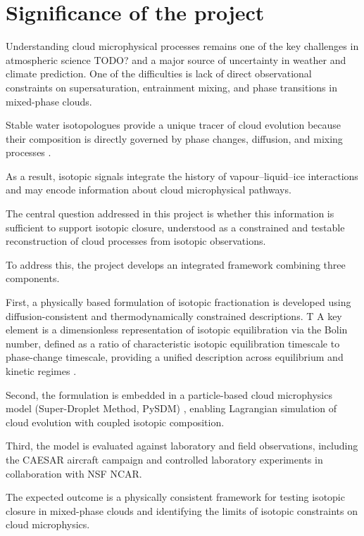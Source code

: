 \documentclass[12pt]{article}
\begin{document}
\section{Significance of the project}
Understanding cloud microphysical processes remains one of the key challenges in atmospheric science
TODO? and a major source of uncertainty in weather and climate prediction.
One of the difficulties is lack of direct observational constraints on supersaturation,
entrainment mixing, and phase transitions in mixed-phase clouds.

Stable water isotopologues provide a unique tracer of cloud evolution because their composition
is directly governed by phase changes, diffusion, and mixing processes
\cite{2008_Horita_EtAl,1975_Merlivat_Coantic,2003_Cappa_EtAl}.

As a result, isotopic signals integrate the history of vapour–liquid–ice interactions
and may encode information about cloud microphysical pathways.

The central question addressed in this project is whether this information is sufficient
to support isotopic closure,
understood as a constrained and testable reconstruction of cloud processes from isotopic observations.

To address this, the project develops an integrated framework combining three components.

First, a physically based formulation of isotopic fractionation is developed
using diffusion-consistent and thermodynamically constrained descriptions.
T
A key element is a dimensionless representation of isotopic equilibration via the Bolin number,
defined as a ratio of characteristic isotopic equilibration timescale to phase-change timescale,
providing a unified description across equilibrium and kinetic regimes
\cite{1958_Bolin}.

Second, the formulation is embedded in a particle-based cloud microphysics model
(Super-Droplet Method, PySDM)
\cite{2009_Shima_EtAl, Arabas},
enabling Lagrangian simulation of cloud evolution with coupled isotopic composition.

Third, the model is evaluated against laboratory and field observations,
including the CAESAR aircraft campaign and controlled laboratory
experiments in collaboration with NSF NCAR.

The expected outcome is a physically consistent framework for testing isotopic closure
in mixed-phase clouds and identifying the limits of isotopic constraints on cloud microphysics.
\end{document}
